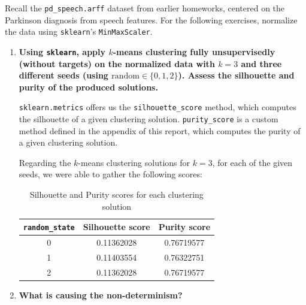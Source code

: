 \documentclass[12pt]{article}
\begin{document}
Recall the \texttt{pd\_speech.arff} dataset from earlier homeworks, centered on
the Parkinson diagnosis from speech features. For the following exercises, normalize
the data using \texttt{sklearn}'s \texttt{MinMaxScaler}.

\begin{enumerate}[leftmargin=\labelsep,resume]

  \item \textbf{Using \texttt{sklearn}, apply $k$-means clustering fully unsupervisedly
          (without targets) on the normalized data with $k = 3$ and three different seeds
          (using $\text{random} \in \{0, 1, 2\}$). Assess the silhouette and purity of the produced solutions.}

        \texttt{sklearn.metrics} offers us the \texttt{silhouette\_score} method, which
        computes the silhouette of a given clustering solution.
        \texttt{purity\_score} is a custom method defined in the appendix of this report,
        which computes the purity of a given clustering solution.

        Regarding the $k$-means clustering solutions for $k = 3$, for each of the
        given seeds, we were able to gather the following scores:

        \begin{table}[H]
          \centering
          \begin{tabular}{c|c|c}
            \textbf{\texttt{random\_state}} & \textbf{Silhouette score} & \textbf{Purity score} \\ \hline
            0                               & 0.11362028                & 0.76719577            \\
            1                               & 0.11403554                & 0.76322751            \\
            2                               & 0.11362028                & 0.76719577            \\
          \end{tabular}
          \caption{Silhouette and Purity scores for each clustering solution}
          \label{tab:clustering-solutions-scores}
        \end{table}


  \item \textbf{What is causing the non-determinism?}


\end{enumerate}
\end{document}
